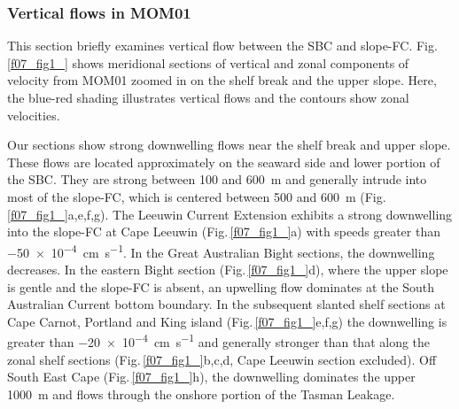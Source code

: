 \documentclass[preprint,3p,review,12pt]{elsarticle}
\begin{document}
\subsubsection{Vertical flows in MOM01} \label{Vertical flows in MOM01}
This section briefly examines vertical flow between the SBC 
and slope-FC\@. Fig.\,\ref{f07_fig1_} shows meridional sections of vertical and zonal components of velocity from MOM01 zoomed in on the shelf break
and the upper slope.
Here, the blue-red shading illustrates vertical flows and the contours show zonal velocities.

Our sections show strong downwelling flows
near the shelf break and upper slope.
These flows are located approximately
on the seaward side and lower portion of the SBC\@.
They are strong between \num{100} and \SI{600}{\meter} and generally intrude into most of the slope-FC, which is centered between \num{500} and \SI{600}{\meter} (Fig.\,\ref{f07_fig1_}a,e,f,g). The Leeuwin Current Extension exhibits a strong downwelling into the slope-FC at Cape Leeuwin (Fig.\,\ref{f07_fig1_}a) with speeds greater than \SI{-50 e-4}{\centi\meter\per\second}.
In the Great Australian Bight sections, the downwelling decreases. In the eastern Bight section (Fig.\,\ref{f07_fig1_}d), where the upper slope is gentle and the slope-FC is absent, an upwelling flow dominates at the South Australian Current bottom boundary. In the subsequent slanted shelf sections at Cape Carnot, Portland and King island (Fig.\,\ref{f07_fig1_}e,f,g) the downwelling is greater than \SI{-20 e-4}{\centi\meter\per\second} and generally stronger than that along the zonal shelf sections (Fig.\,\ref{f07_fig1_}b,c,d, Cape Leeuwin section excluded). Off South East Cape (Fig.\,\ref{f07_fig1_}h), the downwelling dominates the upper \SI{1000}{\meter} and flows through the onshore portion of the Tasman Leakage.
%
\end{document}
